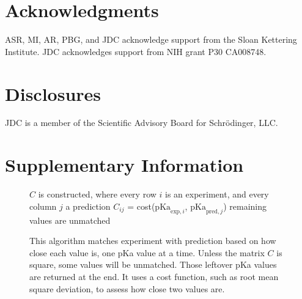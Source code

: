 \documentclass[9pt,lineno,final]{elife}
\newcommand{\pKa}{\mathrm{pKa}}
\begin{document}
\section{Acknowledgments}

ASR, MI, AR, PBG, and JDC acknowledge support from the Sloan Kettering Institute.
JDC acknowledges support from NIH grant P30 CA008748.

\section{Disclosures}

JDC is a member of the Scientific Advisory Board for Schr\"{o}dinger, LLC.





\appendix

\section{Supplementary Information}



% 

\begin{figure}

\begin{algorithm}[H]
	\SetAlgoLined
	\caption{This algorithm matches experiment with prediction based on how close each value is, one pKa value at a time. Unless the matrix $C$ is square, some values will be unmatched. Those leftover pKa values are returned at the end. It uses a cost function, such as root mean square deviation, to assess how close two values are.}
	\label{alg:closest}
	 
	$C$ is constructed, where every row  $i$ is an experiment, and every column $j$ a prediction\;
	$C_{ij}$ = cost($\pKa_{\text{exp},i}$, $\pKa_{\text{pred},j}$)\;
	remaining values are unmatched\;

\end{algorithm}
\end{figure}
\end{document}
